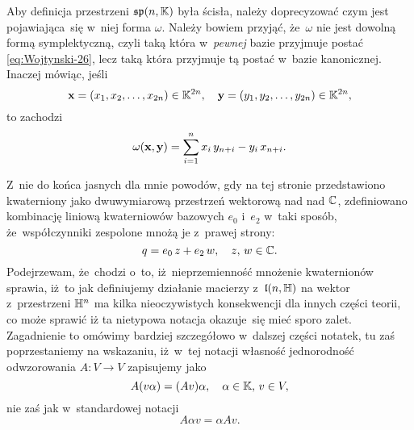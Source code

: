 \documentclass[a4paper,11pt]{article}
\begin{document}
 Aby definicja przestrzeni $\mathfrak{sp}( n, \mathbb{K} )$ była
ścisła, należy doprecyzować czym jest pojawiająca~się w~niej forma $\omega$.
Należy bowiem przyjąć, że~$\omega$ nie jest dowolną formą symplektyczną, czyli
taką która w~\textit{pewnej} bazie przyjmuje postać
\eqref{eq:Wojtynski-26}, lecz taką która przyjmuje tą postać w~bazie
kanonicznej. Inaczej mówiąc, jeśli
\begin{equation}
  \label{eq:Wojtynski-30}
  \mathbf{x} = ( x_{ 1 }, x_{ 2 }, \ldots, x_{ 2n } ) \in \mathbb{K}^{ 2n }, \quad
  \mathbf{y} = ( y_{ 1 }, y_{ 2 }, \ldots, y_{ 2n } ) \in \mathbb{K}^{ 2n },
\end{equation}
to zachodzi
\begin{equation}
  \label{eq:Wojtynski-31}
  \omega( \mathbf{x}, \mathbf{y} ) =
  \sum_{ i = 1 }^{ n } x_{ i } \, y_{ n + i } - y_{ i } \, x_{ n + i }.
\end{equation}

\vspace{\spaceFour}





 Z~nie do końca jasnych dla mnie powodów, gdy na tej stronie
przedstawiono kwaterniony jako dwuwymiarową przestrzeń wektorową nad nad
$\mathbb{C}$, zdefiniowano kombinację liniową kwaterniowów bazowych $e_{ 0 }$
i~$e_{ 2 }$ w~taki sposób, że~współczynniki zespolone mnożą je z~prawej
strony:
\begin{equation}
  \label{eq:Wojtynski-32}
  q = e_{ 0 } \, z + e_{ 2 } \, w, \quad z, \, w \in \mathbb{C}.
\end{equation}
Podejrzewam, że~chodzi o~to, iż~nieprzemienność mnożenie kwaternionów
sprawia, iż~to jak definiujemy działanie macierzy z~$\mathfrak{l}( n, \mathbb{H} )$ na
wektor z~przestrzeni $\mathbb{H}^{ n }$ ma kilka nieoczywistych konsekwencji dla
innych części teorii, co może sprawić iż ta nietypowa notacja okazuje~się
mieć sporo zalet. Zagadnienie to omówimy bardziej szczegółowo w~dalszej
części notatek, tu zaś poprzestaniemy na wskazaniu, iż~w~tej notacji
własność jednorodność odwzorowania $A : V \to V$ zapisujemy jako
\begin{equation}
  \label{eq:Wojtynski-33}
  A ( v \alpha ) = ( A v ) \alpha, \quad \alpha \in \mathbb{K}, \, v \in V,
\end{equation}
nie zaś jak w~standardowej notacji
\begin{equation}
  \label{eq:Wojtynski-34}
  A \alpha v = \alpha A v.
\end{equation}
\end{document}
